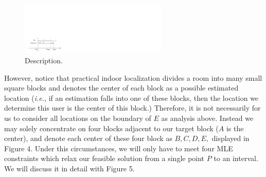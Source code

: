 \documentclass[journal]{IEEEtran}
\newcommand{\ie}{{\em i.e.}}
\begin{document}
\begin{figure}[!htbp]
\centering
\includegraphics [width = 7cm]{Figure4.pdf}
\caption{Description.}
\label{fig:4}
\end{figure}

However, notice that practical indoor localization divides a room into many small square blocks and denotes the center of each block as a possible estimated location (\ie, if an estimation falls into one of these blocks, then the location we determine this user is the center of this block.) Therefore, it is not necessarily for us to consider all locations on the boundary of $E$ as analysis above. Instead we may solely concentrate on four blocks adjacent to our target block ($A$ is the center), and denote each center of these four block as $B, C, D, E,$ displayed in Figure 4. Under this circumstances, we will only have to meet four MLE constraints which relax our feasible solution from a single point $P$ to an interval. We will discuss it in detail with Figure 5.
\end{document}

